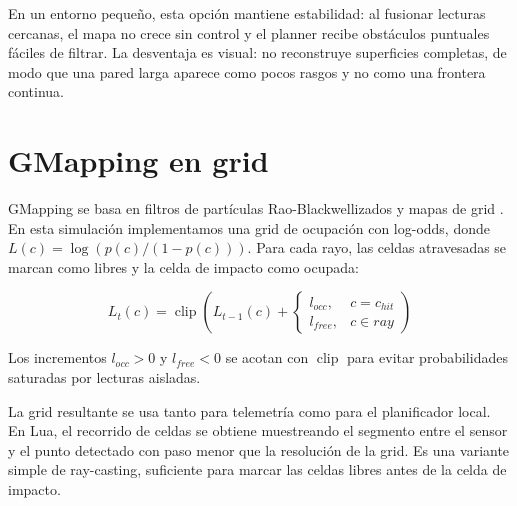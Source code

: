 En un entorno pequeño, esta opción mantiene estabilidad: al fusionar
lecturas cercanas, el mapa no crece sin control y el planner recibe
obstáculos puntuales fáciles de filtrar. La desventaja es visual: no reconstruye
superficies completas, de modo que una pared larga aparece como pocos rasgos y
no como una frontera continua.

\section{GMapping en grid}

GMapping se basa en filtros de partículas Rao-Blackwellizados y mapas de grid
\cite{grisetti2007}. En esta simulación implementamos una grid de ocupación
con log-odds, donde \(L(c)=\log(p(c)/(1-p(c)))\). Para cada rayo, las celdas
atravesadas se marcan como libres y la celda de impacto como ocupada:

\[
L_t(c)=\operatorname{clip}\left(L_{t-1}(c)+
\begin{cases}
l_{occ}, & c=c_{hit}\\
l_{free}, & c\in ray
\end{cases}\right)
\]

Los incrementos \(l_{occ}>0\) y \(l_{free}<0\) se acotan con
\(\operatorname{clip}\) para evitar probabilidades saturadas por lecturas
aisladas.

La grid resultante se usa tanto para telemetría como para el planificador
local. En Lua, el recorrido de celdas se obtiene muestreando el
segmento entre el sensor y el punto detectado con paso menor que la resolución
de la grid. Es una variante simple de ray-casting, suficiente para marcar las
celdas libres antes de la celda de impacto.

